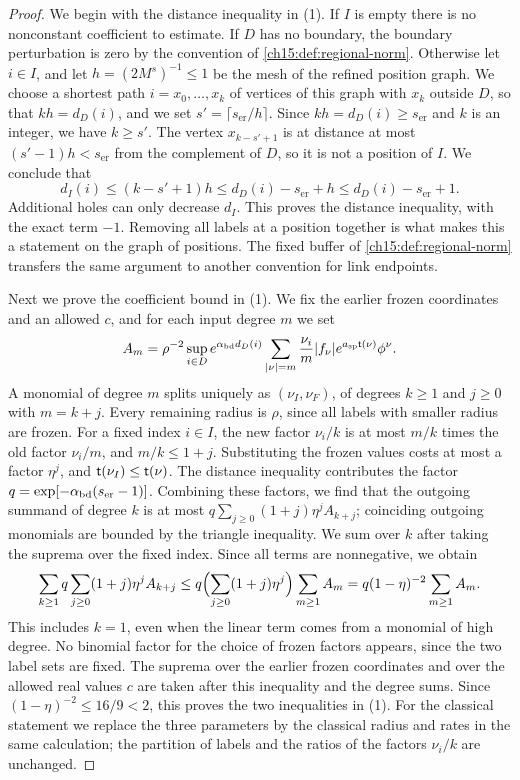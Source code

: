 \begin{proof}
We begin with the distance inequality in (1). If $I$ is empty there is no nonconstant coefficient to estimate. If $D$ has no boundary, the boundary perturbation is zero by the convention of \cref{ch15:def:regional-norm}. Otherwise let $i\in I$, and let $h=(2M^s)^{-1}\le1$ be the mesh of the refined position graph. We choose a shortest path $i=x_0,\ldots,x_k$ of vertices of this graph with $x_k$ outside $D$, so that $kh=d_D(i)$, and we set $s'=\lceil s_{\mathrm{er}}/h\rceil$. Since $kh=d_D(i)\ge s_{\mathrm{er}}$ and $k$ is an integer, we have $k\ge s'$. The vertex $x_{k-s'+1}$ is at distance at most $(s'-1)h<s_{\mathrm{er}}$ from the complement of $D$, so it is not a position of $I$. We conclude that
\[
 d_I(i)\le(k-s'+1)h
 \le d_D(i)-s_{\mathrm{er}}+h
 \le d_D(i)-s_{\mathrm{er}}+1 .
\]
Additional holes can only decrease $d_I$. This proves the distance inequality, with the exact term $-1$. Removing all labels at a position together is what makes this a statement on the graph of positions. The fixed buffer of \cref{ch15:def:regional-norm} transfers the same argument to another convention for link endpoints.

Next we prove the coefficient bound in (1). We fix the earlier frozen coordinates and an allowed $c$, and for each input degree $m$ we set
\[
 A_m=\rho^{-2}\sup_{i\in D}e^{\alpha_{\mathrm{bd}} d_D(i)}
    \sum_{|\nu|=m}\frac{\nu_i}{m}|f_\nu|
                 e^{a_{\mathrm{sp}}\mathsf t(\nu)}\phi^\nu .
\]
A monomial of degree $m$ splits uniquely as $(\nu_I,\nu_F)$, of degrees $k\ge1$ and $j\ge0$ with $m=k+j$. Every remaining radius is $\rho$, since all labels with smaller radius are frozen. For a fixed index $i\in I$, the new factor $\nu_i/k$ is at most $m/k$ times the old factor $\nu_i/m$, and $m/k\le1+j$. Substituting the frozen values costs at most a factor $\eta^j$, and $\mathsf t(\nu_I)\le\mathsf t(\nu)$. The distance inequality contributes the factor $q=\exp[-\alpha_{\mathrm{bd}}(s_{\mathrm{er}}-1)]$. Combining these factors, we find that the outgoing summand of degree $k$ is at most $q\sum_{j\ge0}(1+j)\eta^jA_{k+j}$; coinciding outgoing monomials are bounded by the triangle inequality. We sum over $k$ after taking the suprema over the fixed index. Since all terms are nonnegative, we obtain
\[
 \sum_{k\ge1}q\sum_{j\ge0}(1+j)\eta^j A_{k+j}
 \le q\Bigl(\sum_{j\ge0}(1+j)\eta^j\Bigr)\sum_{m\ge1}A_m
 =q(1-\eta)^{-2}\sum_{m\ge1}A_m .
\]
This includes $k=1$, even when the linear term comes from a monomial of high degree. No binomial factor for the choice of frozen factors appears, since the two label sets are fixed. The suprema over the earlier frozen coordinates and over the allowed real values $c$ are taken after this inequality and the degree sums. Since $(1-\eta)^{-2}\le16/9<2$, this proves the two inequalities in (1). For the classical statement we replace the three parameters by the classical radius and rates in the same calculation; the partition of labels and the ratios of the factors $\nu_i/k$ are unchanged.


\end{proof}
